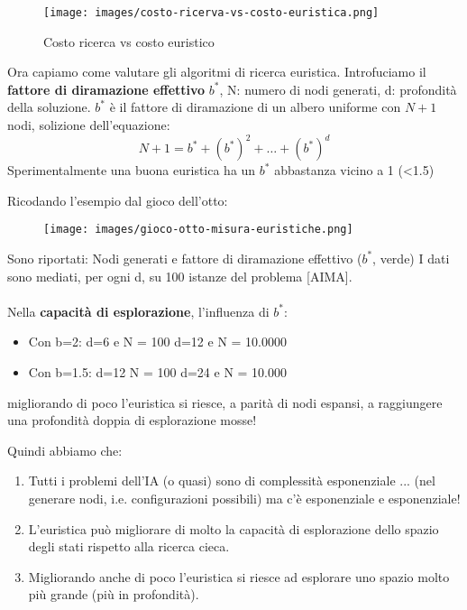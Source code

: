 \begin{figure}[h!]
    \centering
    \texttt{[image: images/costo-ricerva-vs-costo-euristica.png]}
    \caption{Costo ricerca vs costo euristico}
\end{figure}
Ora capiamo come valutare gli algoritmi di ricerca euristica. Introfuciamo
il \textbf{fattore di diramazione effettivo} $b^*$, N: numero di nodi generati, d: profondità della soluzione.
$b^*$ è il fattore di diramazione di un albero uniforme con $N+1$ nodi, solizione dell'equazione:
$$N + 1 = b^* + (b^*)^2 + \dots + (b^*)^d$$
Sperimentalmente una buona euristica ha un $b^*$ abbastanza vicino a 1 (<1.5)
\begin{example}
    Ricodando l'esempio dal gioco dell'otto:
    \begin{figure}[h!]
        \centering
        \texttt{[image: images/gioco-otto-misura-euristiche.png]}
    \end{figure}
    Sono riportati: Nodi generati e fattore di diramazione effettivo ($b^*$, verde)
    I dati sono mediati, per ogni d, su 100 istanze del problema [AIMA].\\\\
    Nella \textbf{capacità di esplorazione}, l'influenza di $b^*$:
    \begin{itemize}
        \item Con b=2: d=6 e N = 100 \hspace{15pt} d=12 e N = 10.0000
        \item Con b=1.5: d=12 N = 100 \hspace{15pt} d=24 e N = 10.000
    \end{itemize}
    migliorando di poco l’euristica si riesce, a parità di nodi espansi, a raggiungere una profondità doppia di esplorazione mosse!
\end{example}
\hspace{-15pt}Quindi abbiamo che:
\begin{enumerate}
    \item Tutti i problemi dell’IA (o quasi) sono di complessità esponenziale ... (nel generare nodi, i.e. configurazioni possibili) ma c’è esponenziale e esponenziale!
    \item L’euristica può migliorare di molto la capacità di esplorazione dello spazio degli stati rispetto alla ricerca cieca.
    \item Migliorando anche di poco l’euristica si riesce ad esplorare uno spazio molto più grande (più in profondità).
\end{enumerate}
